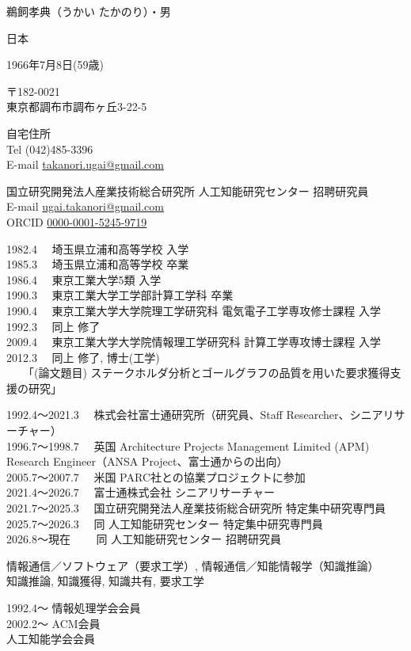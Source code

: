 \documentclass[dvipdfmx]{jlreq}
\begin{document}
\begin{description}[style=nextline]
\item [〇氏名（フリガナ）・性別] 鵜飼孝典（うかい たかのり）・男
\item [〇国籍] 日本
\item [〇生年月日(年齢)] 1966年7月8日(59歳)
\item [〇現住所] 〒182-0021\\
                 東京都調布市調布ヶ丘3-22-5
\item [〇連絡先] 自宅住所\\
                 Tel (042)485-3396\\
                 E-mail \href{mailto:takanori.ugai@gmail.com}{takanori.ugai@gmail.com}
\item [〇勤務先] 国立研究開発法人産業技術総合研究所 人工知能研究センター 招聘研究員\\
                 E-mail \href{mailto:ugai.takanori@gmail.com}{ugai.takanori@gmail.com}\\
                 ORCID \href{https://orcid.org/0000-0001-5245-9719}{0000-0001-5245-9719}
\item [〇学歴]
1982.4 　埼玉県立浦和高等学校 入学\\
1985.3 　埼玉県立浦和高等学校 卒業\\
1986.4 　東京工業大学5類 入学\\
1990.3 　東京工業大学工学部計算工学科 卒業\\
1990.4 　東京工業大学大学院理工学研究科 電気電子工学専攻修士課程 入学\\
1992.3 　同上 修了\\
2009.4　 東京工業大学大学院情報理工学研究科 計算工学専攻博士課程 入学\\
2012.3　 同上 修了, 博士(工学)\\
　　「(論文題目) ステークホルダ分析とゴールグラフの品質を用いた要求獲得支援の研究」
\item [〇職歴]
1992.4～2021.3 　株式会社富士通研究所（研究員、Staff Researcher、シニアリサーチャー）\\
1996.7～1998.7 　英国 Architecture Projects Management Limited (APM) Research Engineer（ANSA Project、富士通からの出向）\\
2005.7～2007.7 　米国 PARC社との協業プロジェクトに参加\\
2021.4～2026.7 　富士通株式会社 シニアリサーチャー\\
2021.7～2025.3 　国立研究開発法人産業技術総合研究所 特定集中研究専門員\\
2025.7～2026.3 　同 人工知能研究センター 特定集中研究専門員\\
2026.8～現在 　　同 人工知能研究センター 招聘研究員
\item [〇研究分野・キーワード] 情報通信／ソフトウェア（要求工学）, 情報通信／知能情報学（知識推論）\\
知識推論, 知識獲得, 知識共有, 要求工学
\item [〇学会及び社会における活動等]
1992.4～  情報処理学会会員\\
2002.2～  ACM会員\\
人工知能学会会員
\end{description}
\end{document}
